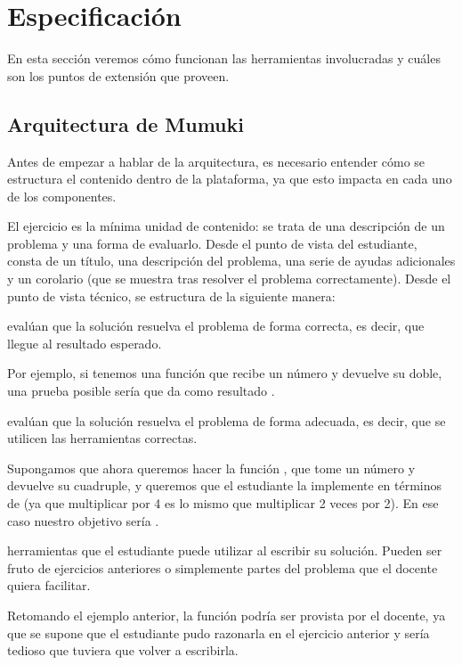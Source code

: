 
\section{Especificación}
En esta sección veremos cómo funcionan las herramientas involucradas y cuáles son los puntos de extensión que proveen.

\subsection{Arquitectura de Mumuki}
Antes de empezar a hablar de la arquitectura, es necesario entender cómo se estructura el contenido dentro de la plataforma, ya que esto impacta en cada uno de los componentes.

El ejercicio es la mínima unidad de contenido: se trata de una descripción de un problema y una forma de evaluarlo. Desde el punto de vista del estudiante, consta de un título, una descripción del problema, una serie de ayudas adicionales y un corolario (que se muestra tras resolver el problema correctamente). Desde el punto de vista técnico, se estructura de la siguiente manera:

\begin{itemize}
   evalúan que la solución resuelva el problema de forma correcta, es decir, que llegue al resultado esperado.

  Por ejemplo, si tenemos una función  que recibe un número y devuelve su doble, una prueba posible sería que  da como resultado .

   evalúan que la solución resuelva el problema de forma adecuada, es decir, que se utilicen las herramientas correctas.

  Supongamos que ahora queremos hacer la función , que tome un número y devuelve su cuadruple, y queremos que el estudiante la implemente en términos de  (ya que multiplicar por 4 es lo mismo que multiplicar 2 veces por 2). En ese caso nuestro objetivo sería .

   herramientas que el estudiante puede utilizar al escribir su solución. Pueden ser fruto de ejercicios anteriores o simplemente partes del problema que el docente quiera facilitar.

  Retomando el ejemplo anterior, la función  podría ser provista por el docente, ya que se supone que el estudiante pudo razonarla en el ejercicio anterior y sería tedioso que tuviera que volver a escribirla.
\end{itemize}

